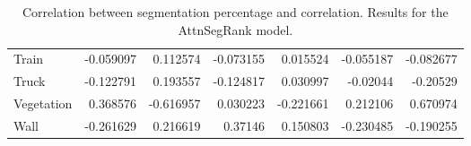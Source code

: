 \begin{table}[H]
\begin{tabular}{|l|rrrrrr|}
    Train         & -0.059097 & 0.112574   & -0.073155 & 0.015524  & -0.055187 & -0.082677 \\
    Truck         & -0.122791 & 0.193557   & -0.124817 & 0.030997  & -0.02044  & -0.20529  \\
    Vegetation    & 0.368576  & -0.616957  & 0.030223  & -0.221661 & 0.212106  & 0.670974  \\
    Wall          & -0.261629 & 0.216619   & 0.37146   & 0.150803  & -0.230485 & -0.190255 \\
    \hline
    \end{tabular}
    \caption[Score and segmentation correlation.]{
        Correlation between segmentation percentage and correlation. Results for the
        AttnSegRank model.
	}
	\label{tab:seg_correlation}
\end{table}

